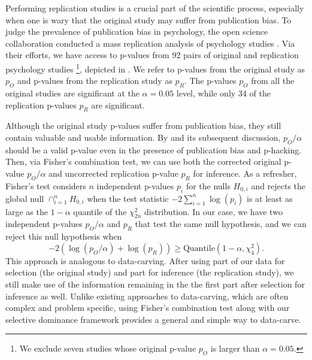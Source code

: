 \documentclass{article}
\begin{document}
Performing replication studies is a crucial part of the scientific process, especially when one is wary that the original study may suffer from publication bias. To judge the prevalence of publication bias in psychology, the open science collaboration conducted a mass replication analysis of psychology studies \citep{OSF}. Via their efforts, we have access to p-values from 92 pairs of original and replication psychology studies \footnote{We exclude seven studies whose original p-value $p_O$ is larger than $\alpha=0.05$.}, depicted in . We refer to p-values from the original study as $p_O$ and p-values from the replication study as $p_R$. The p-values $p_O$ from all the original studies are significant at the $\alpha=0.05$ level, while only 34 of the replication p-values $p_R$ are significant. 

Although the original study p-values suffer from publication bias, they still contain valuable and usable information. By  and its subsequent discussion, $p_O/\alpha$ should be a valid p-value even in the presence of publication bias and p-hacking. Then, via Fisher's combination test, we can use both the corrected original p-value $p_O/\alpha$ and uncorrected replication p-value $p_R$ for inference. As a refresher, Fisher's test considers $n$ independent p-values $p_i$ for the nulls $H_{0, i}$ and rejects the global null $\cap_{i=1}^n H_{0, i}$ when the test statistic $-2 \sum_{i=1}^n \log(p_i) $ is at least as large as the $1-\alpha$ quantile of the $\chi^2_{2n}$ distribution. In our case, we have two independent p-values $p_O/\alpha$ and $p_R$ that test the same null hypothesis, and we can reject this null hypothesis when 
\begin{equation*}
    -2 (\log(p_O/\alpha) + \log(p_R)) \geq \text{Quantile}(1-\alpha, \chi^2_4). 
\end{equation*}
This approach is analogous to data-carving. After using part of our data for selection (the original study) and part for inference (the replication study), we still make use of the information remaining in the the first part after selection for inference as well. Unlike existing approaches to data-carving, which are often complex and problem specific, using Fisher's combination test along with our selective dominance framework provides a general and simple way to data-carve. 
\end{document}
